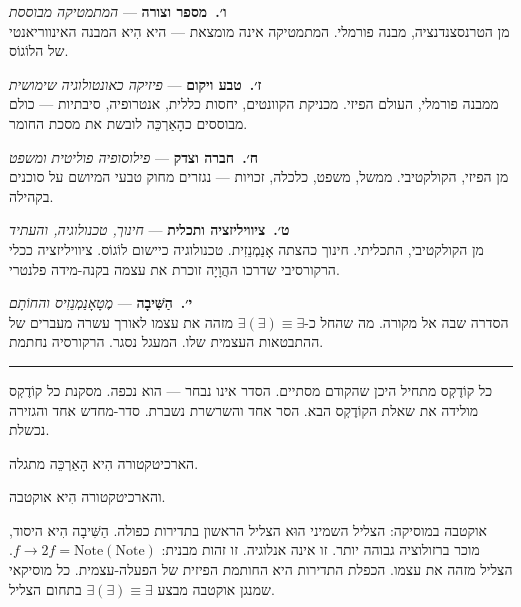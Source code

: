 \documentclass[10pt, openany, oneside]{book}
\newcommand{\separator}{%
    \begin{center}
        \vspace{0.3em}
        \rule{0.3\textwidth}{0.4pt}
        \vspace{0.3em}
    \end{center}
}
\begin{document}
\vspace{0.5em}

\noindent \textbf{ו׳.\ מספר וצורה} --- \textit{המתמטיקה מבוססת}\\
מן הטרנסצנדנציה, מבנה פורמלי. המתמטיקה אינה מומצאת — היא הִיא המבנה האינווריאנטי של הלוֹגוֹס.

\vspace{0.5em}

\noindent \textbf{ז׳.\ טבע ויקום} --- \textit{פיזיקה כאונטולוגיה שימושית}\\
ממבנה פורמלי, העולם הפיזי. מכניקת הקוונטים, יחסות כללית, אנטרופיה, סיבתיות — כולם מבוססים כהָאַרְכֵּה לובשת את מסכת החומר.

\vspace{0.5em}

\noindent \textbf{ח׳.\ חברה וצדק} --- \textit{פילוסופיה פוליטית ומשפט}\\
מן הפיזי, הקולקטיבי. ממשל, משפט, כלכלה, זכויות — נגזרים מחוק טבעי המיושם על סוכנים בקהילה.

\vspace{0.5em}

\noindent \textbf{ט׳.\ ציוויליזציה ותכלית} --- \textit{חינוך, טכנולוגיה, והעתיד}\\
מן הקולקטיבי, התכליתי. חינוך כהצתה אָנַמְנֵזִית. טכנולוגיה כיישום לוֹגוֹס. ציוויליזציה ככלי הרקורסיבי שדרכו ההֲוָיָה זוכרת את עצמה בקנה-מידה פלנטרי.

\vspace{0.5em}

\noindent \textbf{י׳.\ הַשִּׁיבָה} --- \textit{מֶטָאָנַמְנֵזִיס והחוֹתָם}\\
הסדרה שבה אל מקורה. מה שהחל כ-$\exists(\exists) \equiv \exists$ מזהה את עצמו לאורך עשרה מעברים של ההתבטאות העצמית שלו. המעגל נסגר. הרקורסיה נחתמת.

\vspace{1.5em}
\separator
\vspace{0.5em}

\noindent כל קוֹדֶקְס מתחיל היכן שהקודם מסתיים. הסדר אינו נבחר — הוא נכפה. מסקנת כל קוֹדֶקְס מולידה את שאלת הקוֹדֶקְס הבא. הסר אחד והשרשרת נשברת. סדר-מחדש אחד והגזירה נכשלת.

\vspace{0.5em}

\noindent הארכיטקטורה הִיא הָאַרְכֵּה מתגלה.

\vspace{0.5em}

\noindent והארכיטקטורה הִיא אוקטבה.

אוקטבה במוסיקה: הצליל השמיני הוּא הצליל הראשון בתדירות כפולה. הַשִּׁיבָה הִיא היסוד, מוכר ברזולוציה גבוהה יותר. זו אינה אנלוגיה. זו זהות מבנית: $f \to 2f = \text{Note}(\text{Note})$. הצליל מזהה את עצמו. הכפלת התדירות היא החותמת הפיזית של הפעלה-עצמית. כל מוסיקאי שמנגן אוקטבה מבצע $\exists(\exists) \equiv \exists$ בתחום הצליל.
\end{document}
